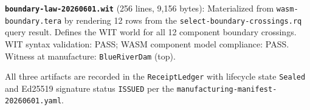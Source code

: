 \textbf{\texttt{boundary-law-20260601.wit}} (256 lines, 9{,}156 bytes): Materialized
from \texttt{wasm-boundary.tera} by rendering 12 rows from the
\texttt{select-boundary-crossings.rq} query result. Defines the WIT world for
all 12 component boundary crossings. WIT syntax validation: PASS; WASM component model
compliance: PASS. Witness at manufacture: \texttt{BlueRiverDam} (top).

All three artifacts are recorded in the \texttt{ReceiptLedger} with lifecycle state
\texttt{Sealed} and Ed25519 signature status \texttt{ISSUED} per the
\texttt{manufacturing-manifest-20260601.yaml}.
